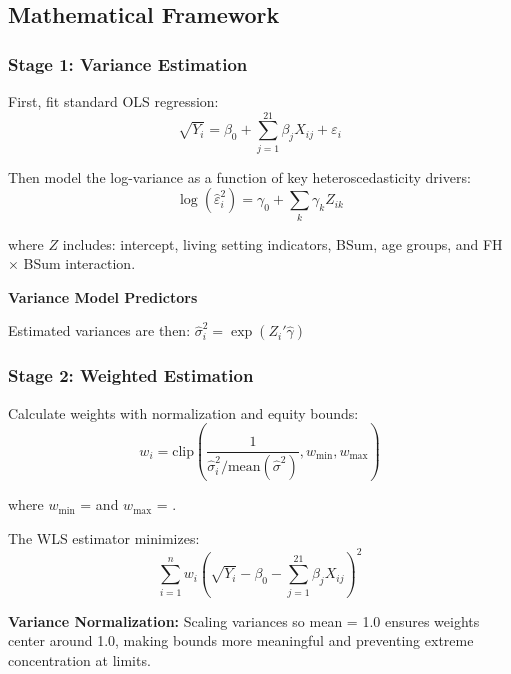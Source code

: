 \subsection{Mathematical Framework}

\subsubsection{Stage 1: Variance Estimation}

First, fit standard OLS regression:
\begin{equation}
\sqrt{Y_i} = \beta_0 + \sum_{j=1}^{21} \beta_j X_{ij} + \varepsilon_i
\end{equation}

Then model the log-variance as a function of key heteroscedasticity drivers:
\begin{equation}
\log(\hat{\varepsilon}_i^2) = \gamma_0 + \sum_{k} \gamma_k Z_{ik}
\end{equation}

where $Z$ includes: intercept, living setting indicators, BSum, age groups, and FH $\times$ BSum interaction.

\textbf{Variance Model Predictors}%

Estimated variances are then: $\hat{\sigma}_i^2 = \exp(Z_i'\hat{\gamma})$

\subsubsection{Stage 2: Weighted Estimation}

Calculate weights with normalization and equity bounds:
\begin{equation}
w_i = \text{clip}\left(\frac{1}{\hat{\sigma}_i^2 / \text{mean}(\hat{\sigma}^2)}, w_{\min}, w_{\max}\right)
\end{equation}

where $w_{\min}$ = \ModelFourWeightMin{} and $w_{\max}$ = \ModelFourWeightMax{}.

The WLS estimator minimizes:
\begin{equation}
\sum_{i=1}^n w_i \left(\sqrt{Y_i} - \beta_0 - \sum_{j=1}^{21} \beta_j X_{ij}\right)^2
\end{equation}

\textbf{Variance Normalization:} Scaling variances so mean = 1.0 ensures weights center around 1.0, making bounds more meaningful and preventing extreme concentration at limits.

